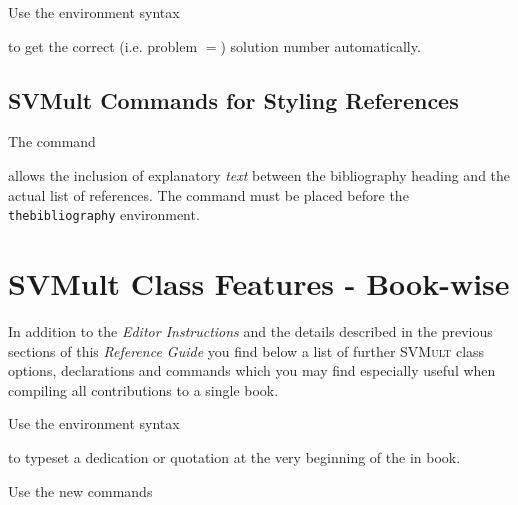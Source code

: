 \documentclass[graybox]{svmult}
\begin{document}
\begin{refguide}
\begin{sloppy}
Use the environment syntax

\cprotect{}

to get the correct (i.e. problem $=$) solution number automatically.

\subsection{SVMult Commands for Styling References}\label{subsec:9}

The command

\cprotect{}

allows the inclusion of explanatory \textit{text} between the bibliography heading
and the actual list of references. The command must be placed before the
\verb|thebibliography| environment.

\section{SVMult Class Features -­ Book-wise}\label{sec:3}

In addition to the \textit{Editor Instructions} and the details described in the previous
sections of this \textit{Reference Guide} you find below a list of further \textsc{SVMult} class
options, declarations and commands which you may find especially useful when
compiling all contributions to a single book.

Use the environment syntax

\cprotect{}

to typeset a dedication or quotation at the very beginning of the in book.

Use the new commands


\end{sloppy}
\end{refguide}
\end{document}
